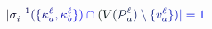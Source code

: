 \documentclass[12pt]{article}
\begin{document}
\makeatletter
\renewcommand*{\@textcolor}[3]{%
  \protect\leavevmode
  \begingroup
    \color#1{#2}#3%
  \endgroup
}
\makeatother
\begin{displaymath}
\mathcolor[RGB]{0,0,15}{|} \mathcolor[RGB]{0,0,30}{\sigma} _ { \mathcolor[RGB]{0,0,45}{i} } ^ { \mathcolor[RGB]{0,0,60}{-} \mathcolor[RGB]{0,0,75}{1} } \mathcolor[RGB]{0,0,90}{(} \mathcolor[RGB]{0,0,105}{\{} \mathcolor[RGB]{0,0,120}{\kappa} _ { \mathcolor[RGB]{0,0,135}{a} } ^ { \mathcolor[RGB]{0,0,150}{\ell} } \mathcolor[RGB]{0,0,165}{,} \mathcolor[RGB]{0,0,180}{\kappa} _ { \mathcolor[RGB]{0,0,195}{b} } ^ { \mathcolor[RGB]{0,0,210}{\ell} } \mathcolor[RGB]{0,0,225}{\}} \mathcolor[RGB]{0,0,240}{)} \mathcolor[RGB]{0,0,255}{\cap} \mathcolor[RGB]{0,15,0}{(} \mathcolor[RGB]{0,15,15}{V} \mathcolor[RGB]{0,15,30}{(} \mathcal { \mathcolor[RGB]{0,15,45}{P} } _ { \mathcolor[RGB]{0,15,60}{a} } ^ { \mathcolor[RGB]{0,15,75}{\ell} } \mathcolor[RGB]{0,15,90}{)} \mathcolor[RGB]{0,15,105}{\setminus} \mathcolor[RGB]{0,15,120}{\{} \mathcolor[RGB]{0,15,135}{v} _ { \mathcolor[RGB]{0,15,150}{a} } ^ { \mathcolor[RGB]{0,15,165}{\ell} } \mathcolor[RGB]{0,15,180}{\}} \mathcolor[RGB]{0,15,195}{)} \mathcolor[RGB]{0,15,210}{|} \mathcolor[RGB]{0,15,225}{=} \mathcolor[RGB]{0,15,240}{1}
\end{displaymath}
\end{document}
